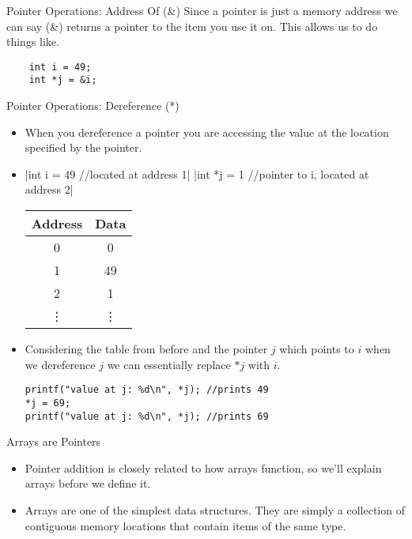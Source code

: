 \documentclass[10pt]{beamer}
\begin{document}
\begin{frame}[fragile]{Pointer Operations: Address Of (\&)}
	Since a pointer is just a memory address we can say (\&) returns a pointer to the item you use it on. This allows us to do things like.
	\begin{verbatim}
	int i = 49;
	int *j = &i;
	\end{verbatim}
\end{frame}

\begin{frame}[fragile]{Pointer Operations: Dereference (*)}
	\begin{itemize}[<+->]
		\item When you dereference a pointer you are accessing the value at the location specified by the pointer.
		\item {}|int i = 49 //located at address 1|
	|int *j = 1 //pointer to i, located at address 2|

	\begin{tabular}{|c|c|}
		\hline
		Address & Data\\
		\hline
		0 &	0\\
		\hline
		1 &	49\\
		\hline
		2 &	1\\
		\hline
		\vdots & \vdots \\
		\hline
	\end{tabular}
		\item Considering the table from before and the pointer $j$ which points to $i$ when we dereference $j$ we can essentially replace $*j$ with $i$.

		\begin{verbatim}
printf("value at j: %d\n", *j); //prints 49
*j = 69;
printf("value at j: %d\n", *j); //prints 69
		\end{verbatim}

	\end{itemize}
\end{frame}


\begin{frame}[fragile]{Arrays are Pointers}
	\begin{itemize}[<+->]
	\item Pointer addition is closely related to how arrays function, so we'll explain arrays before we define it.
	\item Arrays are one of the simplest data structures. They are simply a collection of contiguous memory locations that contain items of the same type.
	\end{itemize}
\end{frame}
\end{document}
